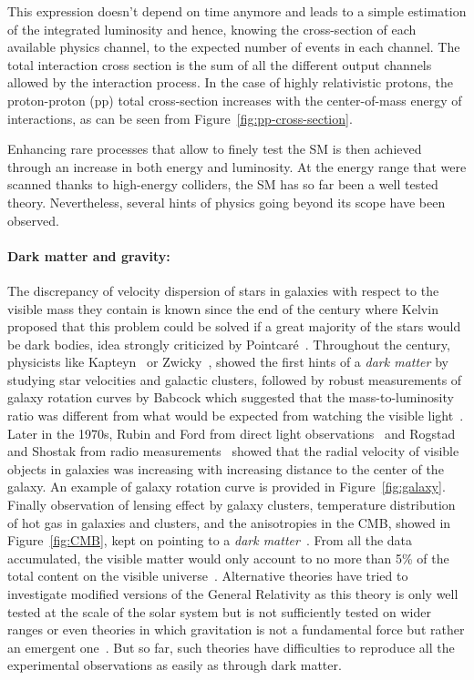 	This expression doesn't depend on time anymore and leads to a simple estimation of the integrated luminosity and hence, knowing the cross-section of each available physics channel, to the expected number of events in each channel. The total interaction cross section is the sum of all the different output channels allowed by the interaction process. In the case of highly relativistic protons, the proton-proton (pp) total cross-section increases with the center-of-mass energy of interactions, as can be seen from Figure~\ref{fig:pp-cross-section}.
	
	Enhancing rare processes that allow to finely test the \acl{SM} is then achieved through an increase in both energy and luminosity. At the energy range that were scanned thanks to high-energy colliders, the SM has so far been a well tested theory. Nevertheless, several hints of physics going beyond its scope have been observed.
	
	\paragraph*{Dark matter and gravity: }
	
	The discrepancy of velocity dispersion of stars in galaxies with respect to the visible mass they contain is known since the end of the  century where Kelvin proposed that this problem could be solved if a great majority of the stars would be dark bodies, idea strongly criticized by Pointcaré~\cite{POINTCARE1906}. Throughout the  century, physicists like Kapteyn~\cite{KAPTEYN1922} or Zwicky~\cite{ZWICKY1933,ZWICKY1937}, showed the first hints of a \textit{dark matter} by studying star velocities and galactic clusters, followed by robust measurements of galaxy rotation curves by Babcock which suggested that the mass-to-luminosity ratio was different from what would be expected from watching the visible light~\cite{BABCOCK1939}. Later in the 1970s, Rubin and Ford from direct light observations~\cite{RUNBIN1970} and Rogstad and Shostak from radio measurements~\cite{ROGSTAD1972} showed that the radial velocity of visible objects in galaxies was increasing with increasing distance to the center of the galaxy. An example of galaxy rotation curve is provided in Figure~\ref{fig:galaxy}. Finally observation of lensing effect by galaxy clusters, temperature distribution of hot gas in galaxies and clusters, and the anisotropies in the \acf{CMB}, showed in Figure~\ref{fig:CMB}, kept on pointing to a \textit{dark matter}~\cite{PLANK2016}. From all the data accumulated, the visible matter would only account to no more than 5\% of the total content on the visible universe~\cite{JAROSIK2011}. Alternative theories have tried to investigate modified versions of the General Relativity as this theory is only well tested at the scale of the solar system but is not sufficiently tested on wider ranges or even theories in which gravitation is not a fundamental force but rather an emergent one~\cite{VERLINDE2016,MAEDER2017}. But so far, such theories have difficulties to reproduce all the experimental observations as easily as through dark matter.

